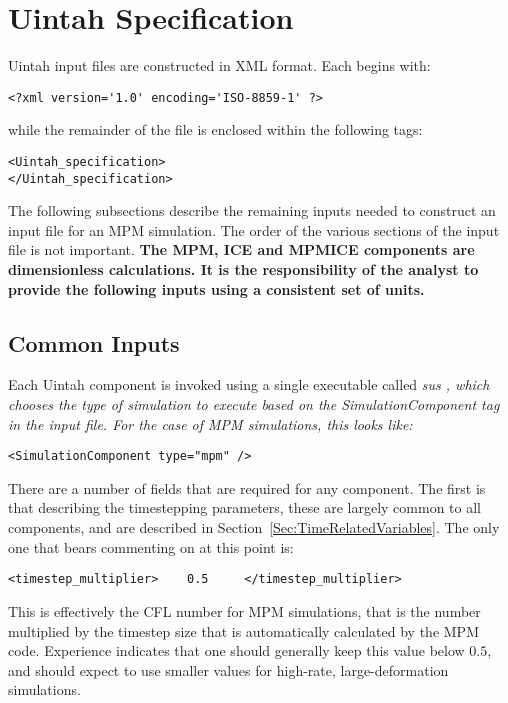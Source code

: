 \section{Uintah Specification} \label{Sec:UintahSpecMPM}

Uintah input files are constructed in XML format.  Each begins with:

\begin{Verbatim}[fontsize=\footnotesize]
<?xml version='1.0' encoding='ISO-8859-1' ?>
\end{Verbatim}
while the remainder of the file is enclosed within the following tags:
\begin{Verbatim}[fontsize=\footnotesize]
<Uintah_specification>
</Uintah_specification>
\end{Verbatim}

The following subsections describe the remaining inputs needed to construct
an input file for an MPM simulation.  The order of the various sections 
of the input file is not important.  {\bf The MPM, ICE and MPMICE components
are dimensionless calculations.  It is the responsibility of the analyst
to provide the following inputs using a consistent set of units.}

\subsection{Common Inputs} \label{Sec:commonInputs}

Each Uintah component is invoked using a single executable called
\it sus \normalfont, which chooses the type of simulation
to execute based on the \it SimulationComponent \normalfont tag in the
input file.  For the case of MPM simulations, this looks like:

\begin{Verbatim}[fontsize=\footnotesize]
 <SimulationComponent type="mpm" />
\end{Verbatim}

There are a number of fields that are required for any component.  The first
is that describing the timestepping parameters, these are largely common to
all components, and are described in Section~\ref{Sec:TimeRelatedVariables}.
The only one that bears commenting on at this point is:

\begin{Verbatim}[fontsize=\footnotesize]
  <timestep_multiplier>    0.5     </timestep_multiplier>
\end{Verbatim}
This is effectively the CFL number for MPM simulations, that is the number
multiplied by the timestep size that is automatically calculated by the MPM
code.  Experience indicates that one should generally keep this value below
$0.5$, and should expect to use smaller values for high-rate, large-deformation
simulations.

